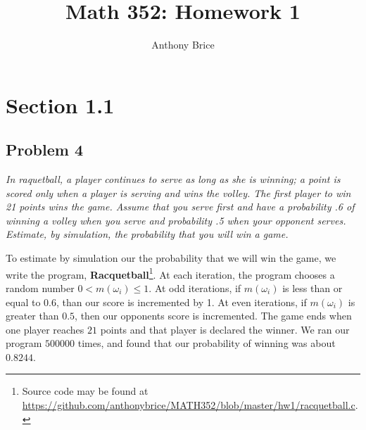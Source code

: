 \documentclass{tufte-handout}
\title{Math 352: Homework 1}
\author{Anthony Brice}
\begin{document}
\maketitle
\section{Section 1.1}
\subsection{Problem 4}
\begin{description}
\item \textit{In raquetball, a player continues to serve as long as
    she is winning; a point is scored only when a player is serving
    and wins the volley. The first player to win 21 points wins the
    game. Assume that you serve first and have a probability .6 of
    winning a volley when you serve and probability .5 when your
    opponent serves. Estimate, by simulation, the probability that you
    will win a game.}
\end{description}  

To estimate by simulation our the probability that we will win the
game, we write the program, \textbf{Racquetball}\footnote{Source code
  may be found at
  \url{https://github.com/anthonybrice/MATH352/blob/master/hw1/racquetball.c}.}. At
each iteration, the program chooses a random number $0 < m(\omega_i)
\leq 1$. At odd iterations, if $m(\omega_i)$ is less than or equal to
$0.6$, than our score is incremented by 1. At even iterations, if
$m(\omega_i)$ is greater than $0.5$, then our opponents score is
incremented. The game ends when one player reaches $21$ points and
that player is declared the winner. We ran our program $500000$ times,
and found that our probability of winning was about $0.8244$.
\end{document}
